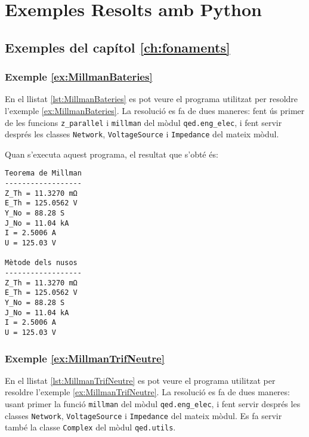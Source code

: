 \chapter{Exemples Resolts amb Python}\label{chap:python-exemples}


\section{Exemples del capítol \ref*{ch:fonaments}}

\hypertarget{exemple:MillmanBateries}{\subsection{Exemple \ref*{ex:MillmanBateries} \MillmanBateries}}

En el llistat \vref{lst:MillmanBateries} es pot veure el programa utilitzat per resoldre l'exemple \vref{ex:MillmanBateries}. La resolució es fa de dues maneres: fent ús primer de les funcions \texttt{z\_parallel} i \texttt{millman} del mòdul \texttt{qed.eng\_elec}, i fent servir després les classes \texttt{Network}, \texttt{VoltageSource} i \texttt{Impedance}  del mateix mòdul.


Quan s'executa aquest programa, el resultat que s'obté és:
\lstset{
	language=,
	numbers=none,
	frame=none
}
\begin{lstlisting}
Teorema de Millman
------------------
Z_Th = 11.3270 mΩ
E_Th = 125.0562 V
Y_No = 88.28 S
J_No = 11.04 kA
I = 2.5006 A
U = 125.03 V

Mètode dels nusos
------------------
Z_Th = 11.3270 mΩ
E_Th = 125.0562 V
Y_No = 88.28 S
J_No = 11.04 kA
I = 2.5006 A
U = 125.03 V
\end{lstlisting} 


\hypertarget{exemple:MillmanTrifNeutre}{\subsection{Exemple \ref*{ex:MillmanTrifNeutre} \MillmanTrifNeutre}}

En el llistat \vref{lst:MillmanTrifNeutre} es pot veure el programa utilitzat per resoldre l'exemple \vref{ex:MillmanTrifNeutre}. La resolució es fa de dues maneres: usant primer la funció \texttt{millman} del mòdul \texttt{qed.eng\_elec}, i fent servir després les classes \texttt{Network},  \texttt{VoltageSource} i \texttt{Impedance}  del mateix mòdul. Es fa servir també la classe \texttt{Complex} del mòdul \texttt{qed.utils}.


